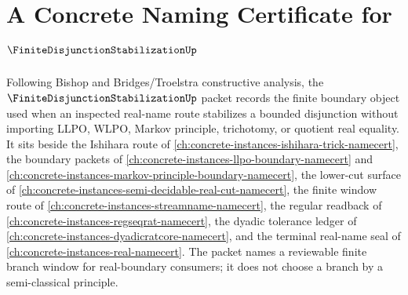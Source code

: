 \chapter{A Concrete Naming Certificate for $\FiniteDisjunctionStabilizationUp$}
\label{ch:concrete-instances-finite-disjunction-stabilization-namecert}

Following Bishop and Bridges/Troelstra constructive analysis, the $\FiniteDisjunctionStabilizationUp$ packet records the finite boundary object used when an inspected real-name route stabilizes a bounded disjunction without importing LLPO, WLPO, Markov principle, trichotomy, or quotient real equality. It sits beside the Ishihara route of \autoref{ch:concrete-instances-ishihara-trick-namecert}, the boundary packets of \autoref{ch:concrete-instances-llpo-boundary-namecert} and \autoref{ch:concrete-instances-markov-principle-boundary-namecert}, the lower-cut surface of \autoref{ch:concrete-instances-semi-decidable-real-cut-namecert}, the finite window route of \autoref{ch:concrete-instances-streamname-namecert}, the regular readback of \autoref{ch:concrete-instances-regseqrat-namecert}, the dyadic tolerance ledger of \autoref{ch:concrete-instances-dyadicratcore-namecert}, and the terminal real-name seal of \autoref{ch:concrete-instances-real-namecert}. The packet names a reviewable finite branch window for real-boundary consumers; it does not choose a branch by a semi-classical principle.

